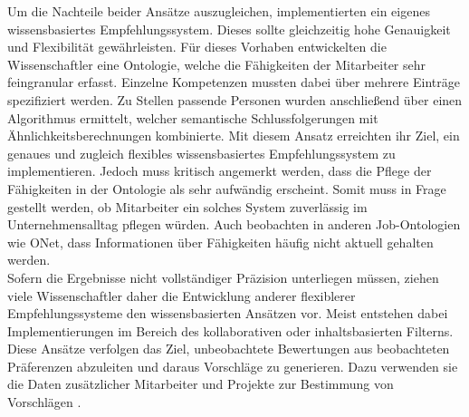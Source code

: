 Um die Nachteile beider Ansätze auszugleichen, implementierten \textcite[S. 4ff.]{semanticMatchmaking:2009} ein eigenes wissensbasiertes Empfehlungssystem. Dieses sollte gleichzeitig hohe Genauigkeit und Flexibilität gewährleisten. Für dieses Vorhaben entwickelten die Wissenschaftler eine Ontologie, welche die Fähigkeiten der Mitarbeiter sehr feingranular erfasst. Einzelne Kompetenzen mussten dabei über mehrere Einträge spezifiziert werden. Zu Stellen passende Personen wurden anschließend über einen Algorithmus ermittelt, welcher semantische Schlussfolgerungen mit Ähnlichkeitsberechnungen kombinierte. Mit diesem Ansatz erreichten \textcite[S. 11f.]{semanticMatchmaking:2009} ihr Ziel, ein genaues und zugleich flexibles wissensbasiertes Empfehlungssystem zu implementieren. Jedoch muss kritisch angemerkt werden, dass die Pflege der Fähigkeiten in der Ontologie als sehr aufwändig erscheint. Somit muss in Frage gestellt werden, ob Mitarbeiter ein solches System zuverlässig im Unternehmensalltag pflegen würden. Auch \textcite[S. 2]{aCombinedRepresentation:2018} beobachten in anderen Job-Ontologien wie \acs{ONet}, dass Informationen über Fähigkeiten häufig nicht aktuell gehalten werden.\\
Sofern die Ergebnisse nicht vollständiger Präzision unterliegen müssen, ziehen viele Wissenschaftler daher die Entwicklung anderer flexiblerer Empfehlungssysteme den wissensbasierten Ansätzen vor. Meist entstehen dabei Implementierungen im Bereich des kollaborativen oder inhaltsbasierten Filterns. Diese Ansätze verfolgen das Ziel, unbeobachtete Bewertungen aus beobachteten Präferenzen abzuleiten und daraus Vorschläge zu generieren. Dazu verwenden sie die Daten zusätzlicher Mitarbeiter und Projekte zur Bestimmung von Vorschlägen \cite[S. 3ff.]{recommenderSystems:2016}.

